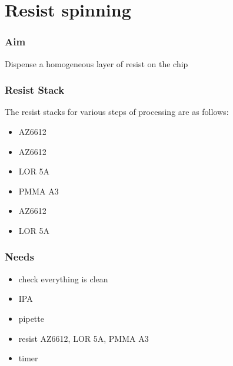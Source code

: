 \section{Resist spinning}

\subsubsection{Aim}
Dispense a homogeneous layer of resist on the chip

\subsubsection{Resist Stack}
The resist stacks for various steps of processing are as follows:
\begin{description}[noitemsep, nolistsep, leftmargin=\parindent, labelindent=\parindent]
\item[Mesa Etch] \hfill
  \begin{itemize} [noitemsep, nolistsep]
    \item AZ6612
  \end{itemize}
\item[Ohmics] \hfill
  \begin{itemize} [noitemsep, nolistsep]
    \item AZ6612
    \item LOR 5A
  \end{itemize}
\item[Fine Gates] \hfill
  \begin{itemize} [noitemsep, nolistsep]
    \item PMMA A3
  \end{itemize}
\item[Optical Gates] \hfill
  \begin{itemize} [noitemsep, nolistsep]
    \item AZ6612
    \item LOR 5A
  \end{itemize}
\end{description}

\subsubsection{Needs}
\begin{itemize} [noitemsep]
\item check everything is clean
\item IPA
\item pipette
\item resist AZ6612, LOR 5A, PMMA A3
\item timer
\end{itemize}

